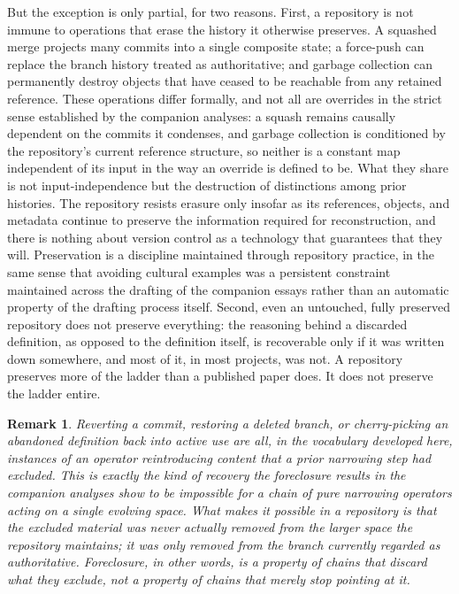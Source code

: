 \documentclass[11pt]{article}
\newtheorem{remark}{Remark}
\begin{document}
But the exception is only partial, for two reasons. First, a repository is not immune to operations that erase the history it otherwise preserves. A squashed merge projects many commits into a single composite state; a force-push can replace the branch history treated as authoritative; and garbage collection can permanently destroy objects that have ceased to be reachable from any retained reference. These operations differ formally, and not all are overrides in the strict sense established by the companion analyses: a squash remains causally dependent on the commits it condenses, and garbage collection is conditioned by the repository's current reference structure, so neither is a constant map independent of its input in the way an override is defined to be. What they share is not input-independence but the destruction of distinctions among prior histories. The repository resists erasure only insofar as its references, objects, and metadata continue to preserve the information required for reconstruction, and there is nothing about version control as a technology that guarantees that they will. Preservation is a discipline maintained through repository practice, in the same sense that avoiding cultural examples was a persistent constraint maintained across the drafting of the companion essays rather than an automatic property of the drafting process itself. Second, even an untouched, fully preserved repository does not preserve everything: the reasoning behind a discarded definition, as opposed to the definition itself, is recoverable only if it was written down somewhere, and most of it, in most projects, was not. A repository preserves more of the ladder than a published paper does. It does not preserve the ladder entire.

\begin{remark}
Reverting a commit, restoring a deleted branch, or cherry-picking an abandoned definition back into active use are all, in the vocabulary developed here, instances of an operator reintroducing content that a prior narrowing step had excluded. This is exactly the kind of recovery the foreclosure results in the companion analyses show to be impossible for a chain of pure narrowing operators acting on a single evolving space. What makes it possible in a repository is that the excluded material was never actually removed from the larger space the repository maintains; it was only removed from the branch currently regarded as authoritative. Foreclosure, in other words, is a property of chains that discard what they exclude, not a property of chains that merely stop pointing at it.
\end{remark}
\end{document}
